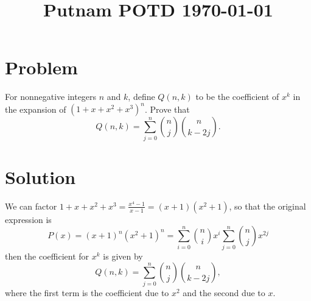 \documentclass[amssymb,pra,12pt,aps,notitlepage]{revtex4-1}
\begin{document}
\title{Putnam POTD \today}
\maketitle

\section{Problem}
For nonnegative integers $n$ and $k$, define $Q(n, k)$ to be the coefficient of $x^k$ in the expansion of $(1 + x + x^2 + x^3)^n$. Prove that
\[
Q(n, k) = \sum_{j=0}^n \binom{n}{j} \binom{n}{k - 2j}.
\]

\section{Solution}
We can factor $1+x+x^2+x^3 = \frac{x^4-1}{x-1} = (x+1)(x^2+1)$,
so that the original expression is 
\[P(x) = (x+1)^n(x^2+1)^n = \sum_{i=0}^{n} {n \choose i} x^i \sum_{j=0}^{n} {n \choose j} x^{2j}\] 
then the coefficient for $x^k$
is given by 
\[
Q(n, k) = \sum_{j=0}^n \binom{n}{j} \binom{n}{k - 2j},
\]
where the first term is the coefficient due to $x^2$ and the second due to $x$.
\end{document}
